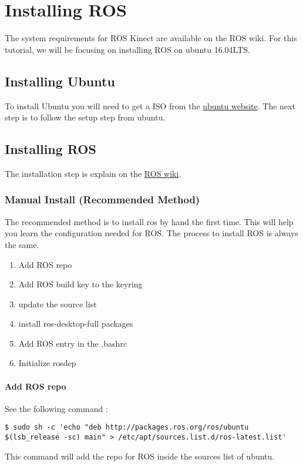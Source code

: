 \chapter{Installing ROS}
The system requirements for ROS Kinect are available on the ROS wiki. For this tutorial, we will be focusing on installing ROS on ubuntu 16.04LTS.

\newpage

\section{Installing Ubuntu}
To install Ubuntu you will need to get a ISO from the \href{www.ubuntu.com}{ubuntu website}. The next step is to follow the setup step from ubuntu.

\newpage

\section {Installing ROS}
The installation step is explain on the \href{wiki.ros.org/kinetic/Installation/Ubuntu}{ROS wiki}.

\subsection{Manual Install (Recommended Method)}
The recommended method is to install ros by hand the first time. This will help you learn the configuration needed for ROS. The process to install ROS is always the same.

\begin{enumerate}
	\item Add ROS repo
	\item Add ROS build key to the keyring
	\item update the source list
	\item install ros-desktop-full packages
	\item Add ROS entry in the .bashrc
	\item Initialize rosdep
\end{enumerate}

\subsubsection{Add ROS repo}
\noindent See the following command :
\begin{lstlisting}[breaklines=True language=bash]
$ sudo sh -c 'echo "deb http://packages.ros.org/ros/ubuntu $(lsb_release -sc) main" > /etc/apt/sources.list.d/ros-latest.list'
\end{lstlisting}
\noindent This command will add the repo for ROS inside the sources list of ubuntu.

